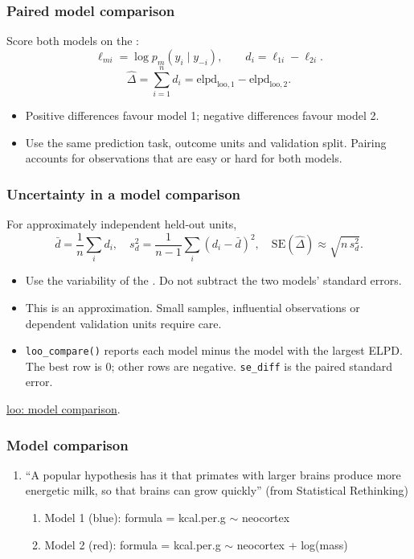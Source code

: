 \documentclass[10pt]{beamer}
\begin{document}
\begin{frame}
\frametitle{Paired model comparison}

  Score both models on the :
  \[
    \ell_{mi}=\log p_m(y_i\mid y_{-i}),\qquad
    d_i=\ell_{1i}-\ell_{2i}.
  \]
  \[
    \widehat\Delta=\sum_{i=1}^n d_i
      =\mathrm{elpd}_{\mathrm{loo},1}-\mathrm{elpd}_{\mathrm{loo},2}.
  \]
  \begin{itemize}
    \item<2-> Positive differences favour model 1; negative differences favour model 2.
    \item<3-> Use the same prediction task, outcome units and validation split.
      Pairing accounts for observations that are easy or hard for both models.
  \end{itemize}
\end{frame}

\begin{frame}
\frametitle{Uncertainty in a model comparison}

  For approximately independent held-out units,
  \[
    \bar d=\frac1n\sum_i d_i,\quad
    s_d^2=\frac{1}{n-1}\sum_i(d_i-\bar d)^2,
    \quad
    \mathrm{SE}(\widehat\Delta)\approx\sqrt{n\,s_d^2}.
  \]
  \begin{itemize}
  \item<2-> Use the variability of the .
    Do not subtract the two models' standard errors.
  \item<3-> This is an approximation. Small samples, influential observations
    or dependent validation units require care.
  \item<4-> \texttt{loo\_compare()} reports each model minus the model with
    the largest ELPD. The best row is 0; other rows are negative.
    \texttt{se\_diff} is the paired standard error.
  \end{itemize}
  {\scriptsize \href{https://mc-stan.org/loo/reference/loo_compare.html}{loo: model comparison}.}
\end{frame}


\begin{frame}{}
\frametitle{Model comparison}

 \begin{enumerate}
 \item ``A popular hypothesis has it that primates with larger brains
   produce more energetic milk, so that brains can grow quickly'' (from
   Statistical Rethinking)
   \begin{enumerate}
     \item Model 1 (blue): formula = kcal.per.g $\sim$ neocortex
     \item Model 2 (red): formula = kcal.per.g $\sim$ neocortex + log(mass)
   \end{enumerate}
 \end{enumerate}


\end{frame}
\end{document}

